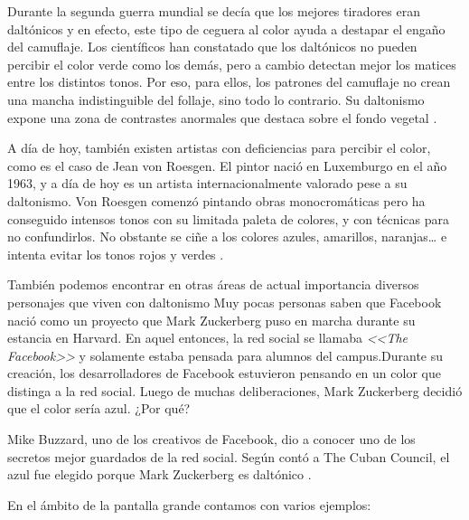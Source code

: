 \documentclass[10pt]{article}
\begin{document}
\setlength{\parskip}{2mm}

Durante la segunda guerra mundial se decía que los mejores tiradores eran daltónicos y en efecto, este tipo de ceguera al color ayuda a destapar el engaño del camuflaje. Los científicos han constatado que los daltónicos no pueden percibir el color verde como los demás, pero a cambio detectan mejor los matices entre los distintos tonos. Por eso, para ellos, los patrones del camuflaje no crean una mancha indistinguible del follaje, sino todo lo contrario. Su daltonismo expone una zona de contrastes anormales que destaca sobre el fondo vegetal \cite{IEEEreferencias:Ref7}.

\setlength{\parskip}{2mm}

A día de hoy, también existen artistas con deficiencias para percibir el color, como es el caso de Jean von Roesgen. El pintor nació en Luxemburgo en el año 1963, y a día de hoy es un artista internacionalmente valorado pese a su daltonismo. Von Roesgen comenzó pintando obras monocromáticas pero ha conseguido intensos tonos con su limitada paleta de colores, y con técnicas para no confundirlos. No obstante se ciñe a los colores azules, amarillos, naranjas… e intenta evitar los tonos rojos y verdes \cite{IEEEreferencias:Ref6}.

\setlength{\parskip}{2mm}

También podemos encontrar en otras áreas de actual importancia diversos personajes que viven con daltonismo 
Muy pocas personas saben que Facebook nació como un proyecto que Mark Zuckerberg puso en marcha durante su estancia en Harvard. En aquel entonces, la red social se llamaba \textit{ <<The Facebook>>} y solamente estaba pensada para alumnos del campus.Durante su creación, los desarrolladores de Facebook estuvieron pensando en un color que distinga a la red social. Luego de muchas deliberaciones, Mark Zuckerberg decidió que el color sería azul. ¿Por qué?

\setlength{\parskip}{2mm}

Mike Buzzard, uno de los creativos de Facebook, dio a conocer uno de los secretos mejor guardados de la red social. Según contó a The Cuban Council, el azul fue elegido porque Mark Zuckerberg es daltónico \cite{IEEEreferencias:Ref8}.

\setlength{\parskip}{2mm}

En el ámbito de la pantalla grande contamos con varios ejemplos: 
\end{document}
